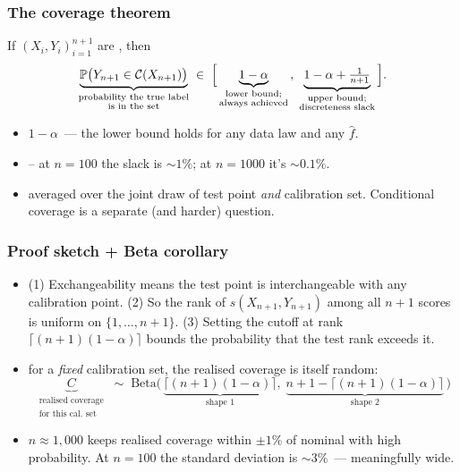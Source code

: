 \documentclass[11pt, aspectratio=169, xcolor={dvipsnames}, usepdftitle=false]{beamer}
\begin{document}
\begin{frame}
\frametitle{The coverage theorem}
\begin{theorem}
If $(X_i, Y_i)_{i=1}^{n+1}$ are , then
\begin{equation*}
\underbrace{\mathbb{P}\bigl(Y_{n+1} \in \mathcal{C}(X_{n+1})\bigr)}_{\substack{\text{probability the true label}\\\text{is in the set}}}
\;\in\;
\Bigl[\,
\underbrace{1 - \alpha}_{\substack{\text{lower bound;}\\\text{always achieved}}}
\,,\;
\underbrace{1 - \alpha + \tfrac{1}{n+1}}_{\substack{\text{upper bound;}\\\text{discreteness slack}}}
\,\Bigr].
\end{equation*}
\end{theorem}
\begin{itemize}
\item {} $1 - \alpha$~--- the lower bound holds for any data law and any $\hat{f}$.
\item {} -- at $n = 100$ the slack is $\sim 1\%$; at $n = 1000$ it's $\sim 0.1\%$.
\item {} averaged over the joint draw of test point \emph{and} calibration set. Conditional coverage is a separate (and harder) question.
\end{itemize}
\end{frame}

\begin{frame}
\frametitle{Proof sketch + Beta corollary}
\begin{itemize}
\item {} (1) Exchangeability means the test point is interchangeable with any calibration point. (2) So the rank of $s(X_{n+1}, Y_{n+1})$ among all $n{+}1$ scores is uniform on $\{1, \dots, n+1\}$. (3) Setting the cutoff at rank $\lceil(n+1)(1-\alpha)\rceil$ bounds the probability that the test rank exceeds it.
\item {} for a \emph{fixed} calibration set, the realised coverage is itself random:
\begin{equation*}
\underbrace{C}_{\substack{\text{realised coverage}\\\text{for this cal.\ set}}}
\;\sim\;
\text{Beta}\bigl(\,
\underbrace{\lceil(n+1)(1-\alpha)\rceil}_{\text{shape 1}},\;
\underbrace{n+1-\lceil(n+1)(1-\alpha)\rceil}_{\text{shape 2}}
\,\bigr)
\end{equation*}
\item {} $n \approx 1{,}000$ keeps realised coverage within $\pm 1\%$ of nominal with high probability. At $n = 100$ the standard deviation is $\sim 3\%$~--- meaningfully wide.
\end{itemize}
\end{frame}
\end{document}
